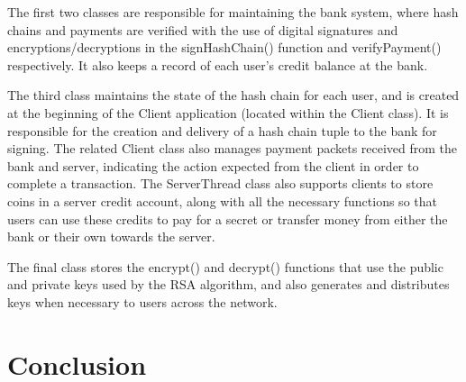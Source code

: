 \documentclass[a4paper,11pt]{article}
\begin{document}
The first two classes are responsible for maintaining the bank system, where 
hash chains and payments are verified with the use of digital signatures and 
encryptions/decryptions in the signHashChain() function and verifyPayment() 
respectively. It also keeps a record of each user's credit balance at the bank.

The third class maintains the state of the hash chain for each user, and is 
created at the beginning of the Client application (located within the Client 
class). It is responsible for the creation and delivery of a hash chain tuple to
the bank for signing. The related Client class also manages payment packets 
received from the bank and server, indicating the action expected from the 
client in order to complete a transaction. The ServerThread class also supports 
clients to store coins in a server credit account, along with all the necessary 
functions so that users can use these credits to pay for a secret or transfer 
money from either the bank or their own towards the server.

The final class stores the encrypt() and decrypt() functions that use the public
and private keys used by the RSA algorithm, and also generates and distributes 
keys when necessary to users across the network.

\section{Conclusion}
\end{document}
